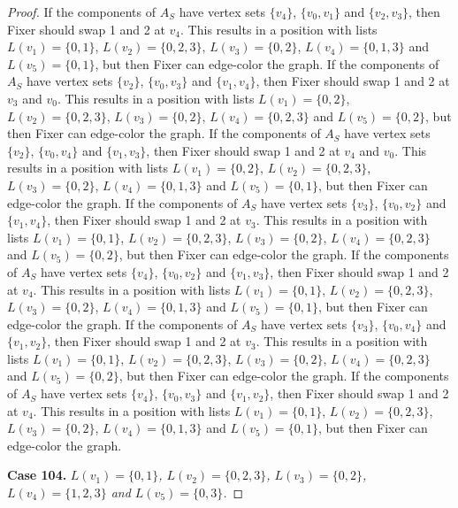 \documentclass[12pt]{amsart}
\theoremstyle{plain}
\theoremstyle{definition}
\theoremstyle{remark}
\begin{document}
\begin{proof}
If the components of $A_S$ have vertex sets $\{v_4\}$, $\{v_0, v_1\}$ and $\{v_2, v_3\}$, then Fixer should swap 1 and 2 at $v_4$. This results in a position with lists $L(v_1) = \{0, 1\}$, $L(v_2) = \{0, 2, 3\}$, $L(v_3) = \{0, 2\}$, $L(v_4) = \{0, 1, 3\}$ and $L(v_5) = \{0, 1\}$, but then Fixer can edge-color the graph.
If the components of $A_S$ have vertex sets $\{v_2\}$, $\{v_0, v_3\}$ and $\{v_1, v_4\}$, then Fixer should swap 1 and 2 at $v_3$ and $v_0$. This results in a position with lists $L(v_1) = \{0, 2\}$, $L(v_2) = \{0, 2, 3\}$, $L(v_3) = \{0, 2\}$, $L(v_4) = \{0, 2, 3\}$ and $L(v_5) = \{0, 2\}$, but then Fixer can edge-color the graph.
If the components of $A_S$ have vertex sets $\{v_2\}$, $\{v_0, v_4\}$ and $\{v_1, v_3\}$, then Fixer should swap 1 and 2 at $v_4$ and $v_0$. This results in a position with lists $L(v_1) = \{0, 2\}$, $L(v_2) = \{0, 2, 3\}$, $L(v_3) = \{0, 2\}$, $L(v_4) = \{0, 1, 3\}$ and $L(v_5) = \{0, 1\}$, but then Fixer can edge-color the graph.
If the components of $A_S$ have vertex sets $\{v_3\}$, $\{v_0, v_2\}$ and $\{v_1, v_4\}$, then Fixer should swap 1 and 2 at $v_3$. This results in a position with lists $L(v_1) = \{0, 1\}$, $L(v_2) = \{0, 2, 3\}$, $L(v_3) = \{0, 2\}$, $L(v_4) = \{0, 2, 3\}$ and $L(v_5) = \{0, 2\}$, but then Fixer can edge-color the graph.
If the components of $A_S$ have vertex sets $\{v_4\}$, $\{v_0, v_2\}$ and $\{v_1, v_3\}$, then Fixer should swap 1 and 2 at $v_4$. This results in a position with lists $L(v_1) = \{0, 1\}$, $L(v_2) = \{0, 2, 3\}$, $L(v_3) = \{0, 2\}$, $L(v_4) = \{0, 1, 3\}$ and $L(v_5) = \{0, 1\}$, but then Fixer can edge-color the graph.
If the components of $A_S$ have vertex sets $\{v_3\}$, $\{v_0, v_4\}$ and $\{v_1, v_2\}$, then Fixer should swap 1 and 2 at $v_3$. This results in a position with lists $L(v_1) = \{0, 1\}$, $L(v_2) = \{0, 2, 3\}$, $L(v_3) = \{0, 2\}$, $L(v_4) = \{0, 2, 3\}$ and $L(v_5) = \{0, 2\}$, but then Fixer can edge-color the graph.
If the components of $A_S$ have vertex sets $\{v_4\}$, $\{v_0, v_3\}$ and $\{v_1, v_2\}$, then Fixer should swap 1 and 2 at $v_4$. This results in a position with lists $L(v_1) = \{0, 1\}$, $L(v_2) = \{0, 2, 3\}$, $L(v_3) = \{0, 2\}$, $L(v_4) = \{0, 1, 3\}$ and $L(v_5) = \{0, 1\}$, but then Fixer can edge-color the graph.

\noindent\textbf{Case 104.  }\textit{$L(v_1) = \{0, 1\}$, $L(v_2) = \{0, 2, 3\}$, $L(v_3) = \{0, 2\}$, $L(v_4) = \{1, 2, 3\}$ and $L(v_5) = \{0, 3\}$.}


\end{proof}
\end{document}
